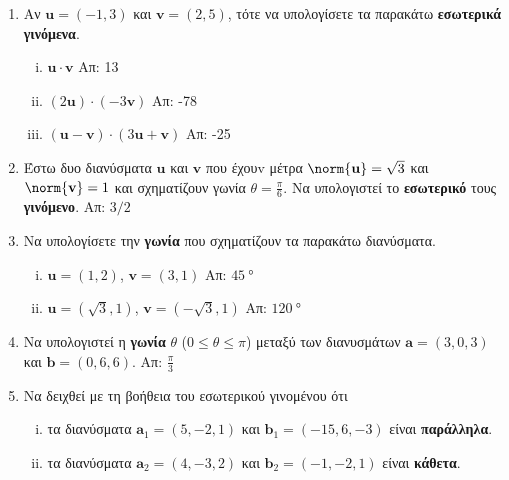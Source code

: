 \documentclass[a4paper,table]{report}
\renewcommand{\vec}{\mathbf}
\begin{document}
\begin{center}
  \minibox{\large \bfseries \textcolor{Col1}{Ασκήσεις στα Διανύσματα}}
\end{center}

\vspace{\baselineskip}



\begin{enumerate}
  \item Αν $ \mathbf{u} = (-1,3) $ και $ \mathbf{v} = (2,5) $, τότε να υπολογίσετε 
    τα παρακάτω \textbf{εσωτερικά γινόμενα}.
    \begin{enumerate}[i)]
      \item $ \mathbf{u} \cdot \mathbf{v} $ \hfill Απ: 13 
      \item $ (2 \mathbf{u}) \cdot (-3 \mathbf{v}) $ \hfill Απ: -78 
      \item $ (\mathbf{u} - \mathbf{v}) \cdot (3 \mathbf{u}+ \mathbf{v}) $ 
        \hfill Απ: -25 
    \end{enumerate}

  \item Έστω δυο διανύσματα $ \mathbf{u} $ και $ \mathbf{v} $ που έχουv μέτρα 
    $ \norm{\mathbf{u}} = \sqrt{3} $ και $ \norm{\mathbf{v}} = 1 $ 
    και σχηματίζουν γωνία $ \theta = \frac{\pi}{6} $. 
    Να υπολογιστεί το \textbf{εσωτερικό} τους \textbf{γινόμενο}. 
    \hfill Απ: $ {3}/{2} $ 

  \item Να υπολογίσετε την \textbf{γωνία} που σχηματίζουν τα παρακάτω διανύσματα.
    \begin{enumerate}[i)]
      \item $ \mathbf{u} = \left(1,2\right) $, $ \mathbf{v} = \left(3,1\right) $ 
        \hfill Απ: $
        \SI{45}{\degree} $ 
      \item $ \mathbf{u} = \left(\sqrt{3}, 1\right) $, $ \mathbf{v} = \left(- \sqrt{3} , 
        1\right) $ \hfill Απ: $ \SI{120}{\degree}$ 
    \end{enumerate}

  \item Να υπολογιστεί η \textbf{γωνία} $ \theta $ ($ 0\leq \theta \leq \pi $) μεταξύ 
    των διανυσμάτων $
    \vec{a} = (3,0,3) $ και $ \vec{b} = (0,6,6) $.
    \hfill Απ: $ \frac{\pi}{3} $

  \item Να δειχθεί με τη βοήθεια του εσωτερικού γινομένου ότι
    \begin{enumerate}[i)]
      \item τα διανύσματα $ \vec{a}_1 = (5,-2,1) $ και $ \vec{b}_1 = (-15,6,-3) $ είναι 
        \textbf{παράλληλα}.
      \item τα διανύσματα $ \vec{a}_2 = (4,-3,2) $ και $ \vec{b}_2 = (-1,-2,1) $ είναι 
        \textbf{κάθετα}.
    \end{enumerate}


\end{enumerate}
\end{document}
